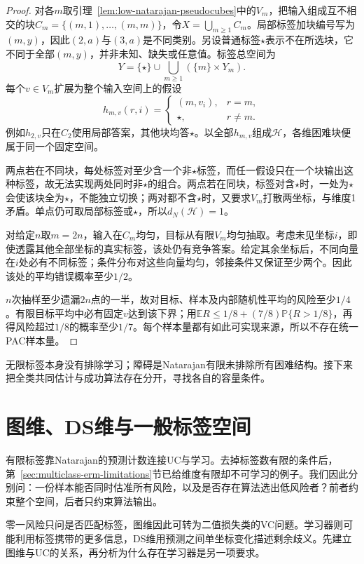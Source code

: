 \begin{proof}
对各$m$取引理~\ref{lem:low-natarajan-pseudocubes}中的$V_m$，把输入组成互不相交的块$C_m=\{(m,1),\ldots,(m,m)\}$，令$X=\bigcup_{m\geq1}C_m$。局部标签加块编号写为$(m,y)$，因此$(2,a)$与$(3,a)$是不同类别。另设普通标签$\star$表示不在所选块，它不同于全部$(m,y)$，并非未知、缺失或任意值。标签总空间为
\[
 Y=\{\star\}\cup\bigcup_{m\geq1}(\{m\}\times Y_m).
\]
每个$v\in V_m$扩展为整个输入空间上的假设
\[
 h_{m,v}(r,i)=
 \begin{cases}
 (m,v_i),&r=m,\\
 \star,&r\neq m.
 \end{cases}
\]
例如$h_{2,v}$只在$C_2$使用局部答案，其他块均答$\star$。以全部$h_{m,v}$组成$\mathcal H$，各维困难块便属于同一个固定空间。

两点若在不同块，每处标签对至少含一个非$\star$标签，而任一假设只在一个块输出这种标签，故无法实现两处同时非$\star$的组合。两点若在同块，标签对含$\star$时，一处为$\star$会使该块全为$\star$，不能独立切换；两对都不含$\star$时，又要求$V_m$打散两坐标，与维度1矛盾。单点仍可取局部标签或$\star$，所以$d_N(\mathcal H)=1$。

对给定$n$取$m=2n$，输入在$C_m$均匀，目标从有限$V_m$均匀抽取。考虑未见坐标$i$，即使透露其他全部坐标的真实标签，该处仍有竞争答案。给定其余坐标后，不同向量在$i$处必有不同标签；条件分布对这些向量均匀，邻接条件又保证至少两个。因此该处的平均错误概率至少$1/2$。

$n$次抽样至少遗漏$2n$点的一半，故对目标、样本及内部随机性平均的风险至少$1/4$。有限目标平均中必有固定$v$达到该下界；用$\mathbb E R\leq1/8+(7/8)\mathbb P\{R>1/8\}$，再得风险超过$1/8$的概率至少$1/7$。每个样本量都有如此可实现来源，所以不存在统一PAC样本量。
\end{proof}

无限标签本身没有排除学习；障碍是Natarajan有限未排除所有困难结构。接下来把全类共同估计与成功算法存在分开，寻找各自的容量条件。

\section{图维、DS维与一般标签空间}
\label{sec:general-multiclass-dimensions}
\label{sec:multiclass-sample-complexity}
有限标签靠Natarajan的预测计数连接UC与学习。去掉标签数有限的条件后，第~\ref{sec:multiclass-erm-limitations}节已给维度有限却不可学习的例子。我们因此分别问：一份样本能否同时估准所有风险，以及是否存在算法选出低风险者？前者约束整个空间，后者只约束算法输出。

零一风险只问是否匹配标签，图维因此可转为二值损失类的VC问题。学习器则可能利用标签携带的更多信息，DS维用预测之间单坐标变化描述剩余歧义。先建立图维与UC的关系，再分析为什么存在学习器是另一项要求。

